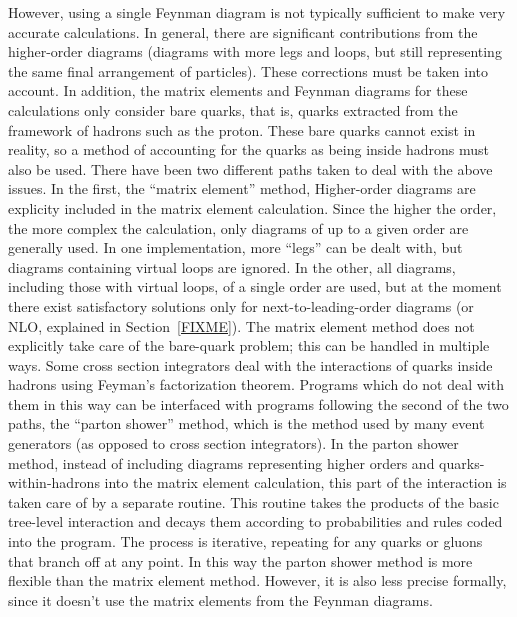 However, using a single Feynman diagram is not typically 
sufficient to make very accurate calculations.  
In general, there are significant contributions from 
the higher-order diagrams  
(diagrams with more legs and loops, 
but still representing the same final arrangement of particles). 
These corrections must be taken into account.  
In addition, the matrix elements and Feynman diagrams 
for these calculations only consider bare quarks, 
that is, quarks extracted from the framework of 
hadrons such as the proton.  
These bare quarks cannot exist in reality, 
so a method of accounting for the quarks 
as being inside hadrons must also be used.  
There have been two different paths taken to deal %
with the above issues.  
In the first, the ``matrix element'' method, 
Higher-order diagrams are explicity included in 
the matrix element calculation.  
Since the higher the order, 
the more complex the calculation, 
only diagrams of up to a given order are 
generally used.  
In one implementation, more ``legs'' can be dealt with, 
but diagrams containing virtual loops are ignored.  %
In the other, all diagrams, including those with virtual 
loops, of a single order are used, 
but at the moment there exist satisfactory solutions 
only for next-to-leading-order diagrams 
(or NLO, explained in Section~\ref{FIXME}).  
The matrix element method does not explicitly 
take care of the bare-quark problem; %
this can be handled in multiple ways.  
Some cross section integrators deal with the interactions of %
quarks inside hadrons using Feyman's factorization theorem. 
Programs which do not deal with them in this way 
can be interfaced with programs following the 
second of the two paths, %
the ``parton shower'' method, 
which is the method used by many event generators 
(as opposed to cross section integrators).  
In the parton shower method, 
instead of including diagrams representing 
higher orders and quarks-within-hadrons 
into the matrix element calculation, 
this part of the interaction is taken care of 
by a separate routine.  
This routine takes the products of the 
basic tree-level interaction 
and decays them according to 
probabilities and rules coded into the program.  
The process is iterative, 
repeating for any quarks or gluons that 
branch off at any point.  
In this way the parton shower method 
is more flexible than the matrix element method. 
However, it is also less precise formally, 
since it doesn't use the matrix elements from the 
Feynman diagrams.  

